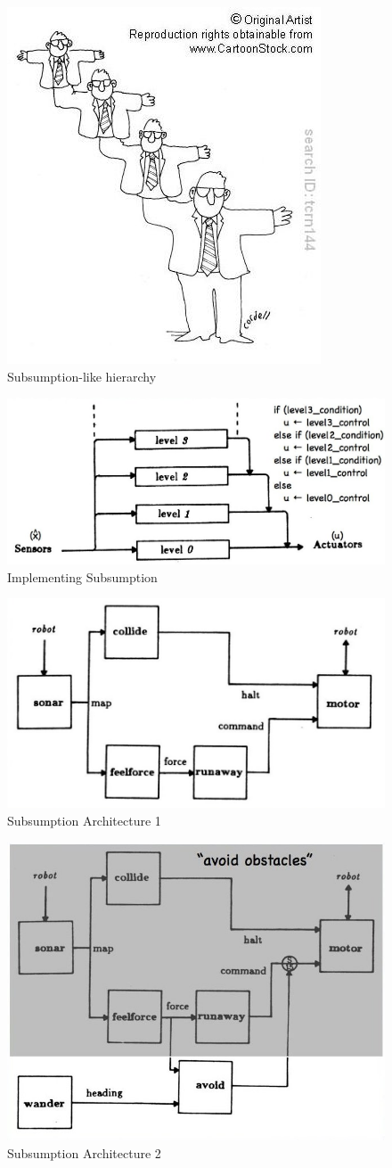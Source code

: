 \begin{figure}[!h]
\centering
\includegraphics[width=0.5\columnwidth]{figures/9_hierarchy.jpg}
\caption{Subsumption-like hierarchy}
\end{figure}

\begin{figure}[!h]
\centering
\includegraphics[width=0.8\columnwidth]{figures/9_sub1.jpg}
\caption{Implementing Subsumption}
\end{figure}

\begin{figure}[!h]
\centering
\includegraphics[width=0.7\columnwidth]{figures/9_sub2.jpg}
\caption{Subsumption Architecture 1}
\end{figure}

\begin{figure}[!h]
\centering
\includegraphics[width=0.6\columnwidth]{figures/9_sub3.jpg}
\caption{Subsumption Architecture 2}
\end{figure}


